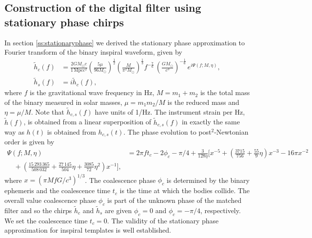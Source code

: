 \subsection{Construction of the digital filter using stationary phase chirps}
\label{ss:digitalfilter}

In section \ref{ss:stationaryphase} we derived the stationary phase
approximation to Fourier transform of the binary inspiral waveform, given by
\begin{align}
\label{eq:spcos}
\tilde{h}_c(f)&=\frac{2GM_\odot c}{1\,\mathrm{Mpc}c^2}
\left(\frac{5\mu}{96M_\odot}\right)^\frac{1}{2}
\left(\frac{M}{\pi^2M_\odot}\right)^\frac{1}{3}
f^{-\frac{7}{6}}\, \left( \frac{GM_\odot}{c^3} \right)^{-\frac{1}{6}}\,
e^{i\Psi(f;M,\eta)},\\
\tilde{h}_s(f)&=i\tilde{h}_c(f),
\label{eq:hsorthog}
\end{align}
where $f$ is the gravitational wave frequency in Hz, $M = m_1+m_2$ 
is the total mass of the binary measured in solar masses, $\mu = m_1 m_2 / M$
is the reduced mass and $\eta = \mu/M$.  Note that $\tilde{h}_{c,s}(f)$ have
units of 1/Hz.  The instrument strain per Hz, $\tilde{h}(f)$, is obtained from
a linear superposition of $\tilde{h}_{c,s}(f)$ in exactly the same way as
$h(t)$ is obtained from $h_{c,s}(t)$. The phase evolution to
post$^2$-Newtonian order is given by
\begin{equation}
\begin{split}
\Psi(f;M,\eta) &= 2\pi ft_c-2\phi_c-\pi/4+\frac{3}{128\eta}\biggl[x^{-5}+
\left(\frac{3715}{756}+\frac{55}{9}\eta\right)x^{-3}
-16\pi x^{-2} \\
\quad +\left(\frac{15\,293\,365}{508\,032}+\frac{27\,145}{504}\eta
+\frac{3085}{72}\eta^2\right)x^{-1}\biggr],
\label{eq:spphase}
\end{split}
\end{equation}
where $x=(\pi M f G/c^3)^{1/3}$. The coalescence phase $\phi_c$ is determined
by the binary ephemeris and the coalescence time $t_c$ is the time at which
the bodies collide. The overall value coalescence phase $\phi_c$ is part of
the unknown phase of the matched filter and so the chirps $\tilde{h}_c$ and
$\tilde{h}_s$ are given $\phi_c=0$ and $\phi_c=-\pi/4$, respectively.
We set the coalescence time $t_c = 0$.  The validity of the stationary
phase approximation for inspiral templates is well
established\cite{Droz:1999qx}.

